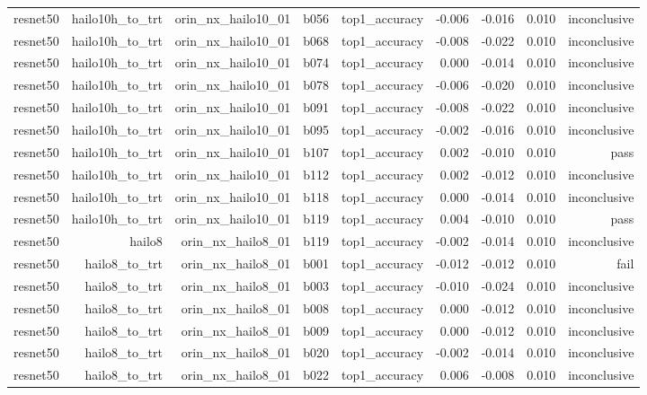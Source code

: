 \begin{table}[t]
\begin{tabular}{lrrrrrrrr}
resnet50 & hailo10h\_to\_trt & orin\_nx\_hailo10\_01 & b056 & top1\_accuracy & -0.006 & -0.016 & 0.010 & inconclusive \\
resnet50 & hailo10h\_to\_trt & orin\_nx\_hailo10\_01 & b068 & top1\_accuracy & -0.008 & -0.022 & 0.010 & inconclusive \\
resnet50 & hailo10h\_to\_trt & orin\_nx\_hailo10\_01 & b074 & top1\_accuracy & 0.000 & -0.014 & 0.010 & inconclusive \\
resnet50 & hailo10h\_to\_trt & orin\_nx\_hailo10\_01 & b078 & top1\_accuracy & -0.006 & -0.020 & 0.010 & inconclusive \\
resnet50 & hailo10h\_to\_trt & orin\_nx\_hailo10\_01 & b091 & top1\_accuracy & -0.008 & -0.022 & 0.010 & inconclusive \\
resnet50 & hailo10h\_to\_trt & orin\_nx\_hailo10\_01 & b095 & top1\_accuracy & -0.002 & -0.016 & 0.010 & inconclusive \\
resnet50 & hailo10h\_to\_trt & orin\_nx\_hailo10\_01 & b107 & top1\_accuracy & 0.002 & -0.010 & 0.010 & pass \\
resnet50 & hailo10h\_to\_trt & orin\_nx\_hailo10\_01 & b112 & top1\_accuracy & 0.002 & -0.012 & 0.010 & inconclusive \\
resnet50 & hailo10h\_to\_trt & orin\_nx\_hailo10\_01 & b118 & top1\_accuracy & 0.000 & -0.014 & 0.010 & inconclusive \\
resnet50 & hailo10h\_to\_trt & orin\_nx\_hailo10\_01 & b119 & top1\_accuracy & 0.004 & -0.010 & 0.010 & pass \\
resnet50 & hailo8 & orin\_nx\_hailo8\_01 & b119 & top1\_accuracy & -0.002 & -0.014 & 0.010 & inconclusive \\
resnet50 & hailo8\_to\_trt & orin\_nx\_hailo8\_01 & b001 & top1\_accuracy & -0.012 & -0.012 & 0.010 & fail \\
resnet50 & hailo8\_to\_trt & orin\_nx\_hailo8\_01 & b003 & top1\_accuracy & -0.010 & -0.024 & 0.010 & inconclusive \\
resnet50 & hailo8\_to\_trt & orin\_nx\_hailo8\_01 & b008 & top1\_accuracy & 0.000 & -0.012 & 0.010 & inconclusive \\
resnet50 & hailo8\_to\_trt & orin\_nx\_hailo8\_01 & b009 & top1\_accuracy & 0.000 & -0.012 & 0.010 & inconclusive \\
resnet50 & hailo8\_to\_trt & orin\_nx\_hailo8\_01 & b020 & top1\_accuracy & -0.002 & -0.014 & 0.010 & inconclusive \\
resnet50 & hailo8\_to\_trt & orin\_nx\_hailo8\_01 & b022 & top1\_accuracy & 0.006 & -0.008 & 0.010 & inconclusive \\

\end{tabular}
\end{table}
